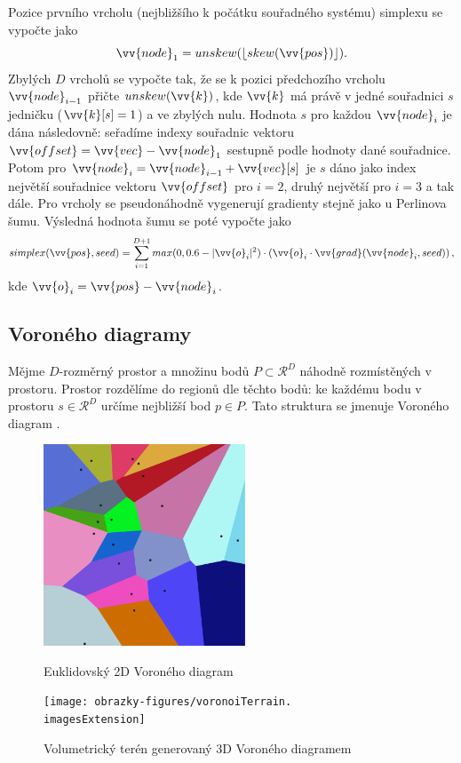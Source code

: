 Pozice prvního vrcholu (nejbližšího k počátku souřadného systému) simplexu se vypočte jako
\begin{equation}
	\vv{node}_1 = unskew(\lfloor skew(\vv{pos}) \rfloor) \text{.}
\end{equation}
Zbylých $D$ vrcholů se vypočte tak, že se k pozici předchozího vrcholu $\vv{node}_{i-1}$ přičte $unskew(\vv{k})$, kde $\vv{k}$ má právě v jedné souřadnici $s$ jedničku ($\vv{k}[s] = 1$) a ve zbylých nulu. Hodnota $s$ pro každou $\vv{node}_{i}$ je dána následovně: seřadíme indexy souřadnic vektoru $\vv{offset} = \vv{vec} - \vv{node}_1$ sestupně podle hodnoty dané souřadnice. Potom pro $\vv{node}_i = \vv{node}_{i-1} + \vv{vec}[s]$ je $s$ dáno jako index největší souřadnice vektoru $\vv{offset}$ pro $i = 2$, druhý největší pro $i = 3$ a tak dále. Pro vrcholy se pseudonáhodně vygenerují gradienty stejně jako u Perlinova šumu. Výsledná hodnota šumu se poté vypočte jako
\begin{equation}
	simplex(\vv{pos}, seed) = \sum_{i=1}^{D+1} max(0, 0.6 - |\vv{o}_i|^2) \cdot \left( \vv{o}_i \cdot \vv{grad}(\vv{node}_i, seed) \right) \text{,}
\end{equation}
kde $\vv{o}_i = \vv{pos} - \vv{node}_i$.

\subsection{Voroného diagramy} \label{voronoiDiagrams}
Mějme $D$-rozměrný prostor a množinu bodů $P \subset \mathcal{R}^D$ náhodně rozmístěných v prostoru. Prostor rozdělíme do regionů dle těchto bodů: ke každému bodu v prostoru $s \in \mathcal{R}^D$ určíme nejbližší bod $p \in P$. Tato struktura se jmenuje Voroného diagram \cite{Boissonnat2010}.

\begin{figure}[H]
	\centering
	\begin{minipage}[t]{0.48\textwidth}
		\centering
		\includegraphics[height=6cm]{obrazky-figures/voronoiwiki.pdf}
		\caption{Euklidovský 2D Voroného diagram}
	\end{minipage}
	\hfill
	\begin{minipage}[t]{0.48\textwidth}
		\centering
		\texttt{[image: obrazky-figures/voronoiTerrain.\\imagesExtension]}
		\caption{Volumetrický terén generovaný 3D Voroného diagramem}
	\end{minipage}
\end{figure}

